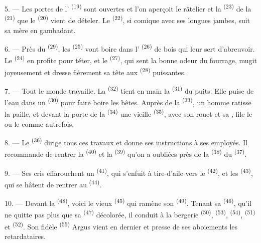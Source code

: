 5. --- Les portes de l' \textsuperscript{(19)} sont ouvertes et
l'on aperçoit le râtelier et la  \textsuperscript{(23)} de la
 \textsuperscript{(21)} que le 
\textsuperscript{(20)} vient de dételer. Le 
\textsuperscript{(22)}, si comique avec ses longues jambes, suit sa mère en
gambadant.

6. --- Près du  \textsuperscript{(29)}, les 
\textsuperscript{(25)} vont boire dans l' \textsuperscript{(26)} de
bois qui leur sert d'abreuvoir. Le  \textsuperscript{(24)} en
profite pour téter, et le  \textsuperscript{(27)}, qui sent la
bonne odeur du fourrage, mugit joyeusement et dresse fièrement sa tête aux
 \textsuperscript{(28)} puissantes.

7. --- Tout le monde travaille. La  \textsuperscript{(32)}
tient en main la  \textsuperscript{(31)} du puits. Elle puise de
l'eau dans un  \textsuperscript{(30)} pour faire boire les bêtes.
Auprès de la  \textsuperscript{(33)}, un homme ratisse la paille,
et devant la porte de la  \textsuperscript{(34)} une vieille
 \textsuperscript{(35)}, avec son rouet et sa
, file le  ou le  comme
autrefois.

\VUsaut{3.0mm}
\VUsaut{3.0mm}

8. --- Le  \textsuperscript{(36)} dirige tous ces travaux et
donne ses instructions à ses employés. Il recommande de rentrer la
 \textsuperscript{(40)} et la 
\textsuperscript{(39)} qu'on a oubliées près de la 
\textsuperscript{(38)} du  \textsuperscript{(37)}.

9. --- Ses cris effarouchent un  \textsuperscript{(41)}, qui
s'enfuit à tire-d'aile vers le  \textsuperscript{(42)}, et
les  \textsuperscript{(43)}, qui se hâtent de rentrer au
 \textsuperscript{(44)}.

10. --- Devant la  \textsuperscript{(48)}, voici le vieux
 \textsuperscript{(45)} qui ramène son 
\textsuperscript{(49)}. Tenant sa  \textsuperscript{(46)},
qu'il ne quitte pas plus que sa  \textsuperscript{(47)}
décolorée, il conduit à la bergerie  \textsuperscript{(50)},
 \textsuperscript{(53)}, 
\textsuperscript{(54)},  \textsuperscript{(51)} et
 \textsuperscript{(52)}. Son fidèle 
\textsuperscript{(55)} Argus vient en dernier et presse de ses aboiements les
retardataires.

